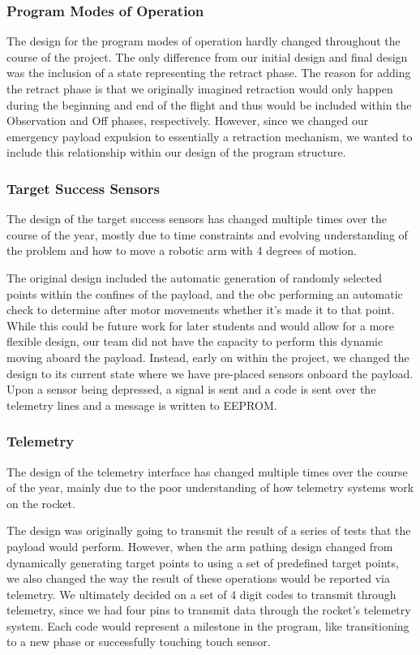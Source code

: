 \subsubsection{Program Modes of Operation}
The design for the program modes of operation hardly changed throughout the course of the project.
The only difference from our initial design and final design was the inclusion of a state representing the
retract phase. The reason for adding the retract phase is that we originally imagined retraction would only happen during the beginning
and end of the flight and thus would be included within the Observation and Off phases, respectively. However, since we changed our
emergency payload expulsion to essentially a retraction mechanism, we wanted to include this relationship within our design of the
program structure.

\subsubsection{Target Success Sensors}
The design of the target success sensors has changed multiple times over the course of the year,
mostly due to time constraints and evolving understanding of the problem and how to move a robotic arm with 4
degrees of motion.

The original design included the automatic generation of randomly selected points within the confines of the payload,
and the \gls{obc} performing an automatic check to determine after motor movements whether it's made it to that point. While
this could be future work for later students and would allow for a more flexible design, our team did not have the capacity
to perform this dynamic moving aboard the \gls{payload}. Instead, early on within the project, we changed the design to its current state
where we have pre-placed sensors onboard the \gls{payload}. Upon a sensor being depressed, a signal is sent and a code is sent over 
the telemetry lines and a message is written to EEPROM.

\subsubsection{Telemetry}
The design of the telemetry interface has changed multiple times over the
course of the year, mainly due to the poor understanding of how telemetry systems
work on the rocket.

The design was originally going to transmit the result of a series of tests
that the \gls{payload} would perform.
However, when the arm pathing design changed from dynamically generating target 
points to using a set of predefined target points, we also changed the way the
result of these operations would be reported via telemetry.
We ultimately decided on a set of 4 digit codes to transmit through telemetry,
since we had four pins to transmit data through the rocket's telemetry system.
Each code would represent a milestone in the program, like transitioning to a
new phase or successfully touching touch sensor.

